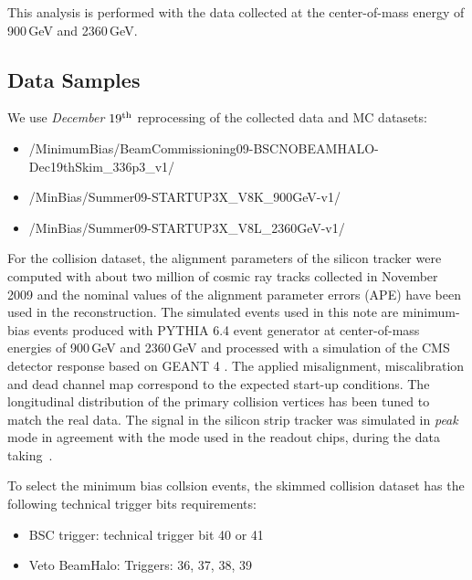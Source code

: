 This analysis is performed with the data collected at the center-of-mass energy of 900\,GeV and 2360\,GeV. 

\subsection {Data Samples}

We use {\em December $19^{\rm th}$} reprocessing of the collected data and MC datasets:
\begin{itemize}
\item /MinimumBias/BeamCommissioning09-BSCNOBEAMHALO-Dec19thSkim\_336p3\_v1/
\item /MinBias/Summer09-STARTUP3X\_V8K\_900GeV-v1/
\item /MinBias/Summer09-STARTUP3X\_V8L\_2360GeV-v1/
\end{itemize} 

For the collision dataset, the alignment parameters of the silicon tracker were computed with about 
two million of cosmic ray tracks collected in November 2009 and the nominal values of the 
alignment parameter errors (APE) have been used in the reconstruction.
The simulated events used in this note are minimum-bias events produced with PYTHIA 6.4 \cite{Pythia} 
event generator at center-of-mass energies of 900\,GeV and 2360\,GeV and processed 
with a simulation of the CMS detector response based on GEANT 4 \cite{Geant}. 
The applied misalignment, miscalibration 
and dead channel map correspond to the expected start-up conditions. 
The longitudinal distribution of the primary collision vertices has been tuned to match the real
data. The signal in the silicon strip tracker was simulated in {\em peak} mode 
in agreement with the mode used in the readout chips, during the data taking~\cite{CMS_NOTE_2009_021}.  

To select the minimum bias collsion events, the skimmed collision dataset has the following 
technical trigger bits requirements: 
\begin{itemize}
\item BSC trigger: technical trigger bit 40 or 41 
\item Veto BeamHalo: Triggers: 36, 37, 38, 39
\end{itemize}

